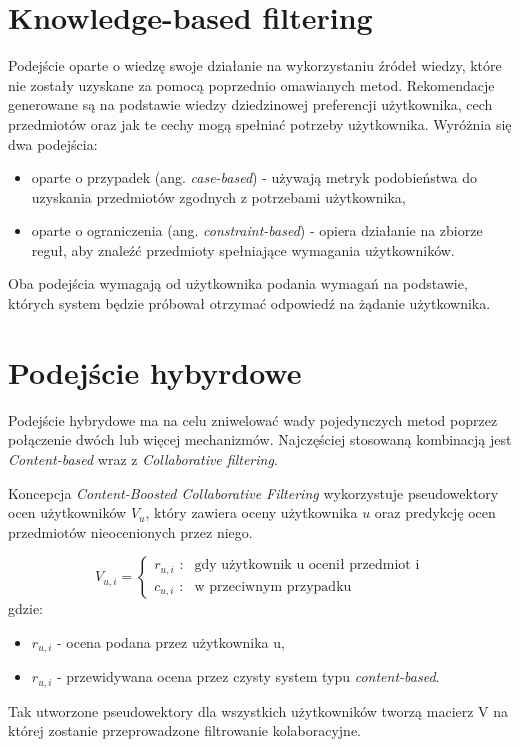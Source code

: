 \section{Knowledge-based filtering}

Podejście oparte o wiedzę swoje działanie na wykorzystaniu źródeł wiedzy, które nie zostały uzyskane za pomocą poprzednio omawianych metod. Rekomendacje generowane są na podstawie wiedzy dziedzinowej preferencji użytkownika, cech przedmiotów oraz jak te cechy mogą spełniać potrzeby użytkownika. Wyróżnia się dwa podejścia:
\begin{itemize}
    \item oparte o przypadek (ang. \textit{case-based}) - używają  metryk podobieństwa do uzyskania przedmiotów zgodnych z potrzebami użytkownika,
    \item oparte o ograniczenia (ang. \textit{constraint-based}) - opiera działanie na zbiorze reguł, aby znaleźć przedmioty spełniające wymagania użytkowników.

\end{itemize}

Oba podejścia wymagają od użytkownika podania wymagań na podstawie, których system będzie próbował otrzymać odpowiedź na żądanie użytkownika.

\section{Podejście hybyrdowe}

Podejście hybrydowe ma na celu zniwelować wady pojedynczych metod poprzez połączenie dwóch lub więcej mechanizmów. Najczęściej stosowaną kombinacją jest \textit{Content-based} wraz z \textit{Collaborative filtering}. 

Koncepcja \textit{Content-Boosted Collaborative Filtering} wykorzystuje pseudowektory ocen użytkowników $V_{u}$, który zawiera oceny użytkownika $u$ oraz predykcję ocen przedmiotów nieocenionych przez niego. 

\begin{equation}
V_{u,i} = \left\{ \begin{array}{ll}
\textrm{$r_{u,i}$ :} & \textrm{gdy użytkownik u ocenił przedmiot i}\\
\textrm{$c_{u,i}$ :} & \textrm{w przeciwnym przypadku}
\end{array} \right.
\end{equation} gdzie:
\begin{itemize}
    \item $r_{u,i}$ - ocena podana przez użytkownika u,
    \item $r_{u,i}$ - przewidywana ocena przez czysty system typu \textit{content-based}. 
\end{itemize}
Tak utworzone pseudowektory dla wszystkich użytkowników tworzą macierz V na której zostanie przeprowadzone filtrowanie kolaboracyjne.


